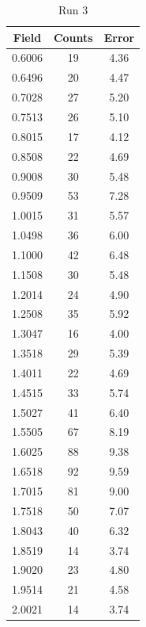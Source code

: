 \begin{table}[h!]
\caption{Run 3}
\begin{tabular}{|c|c|c|} \hline
Field	&	Counts	&	Error	\\ \hline
0.6006	&	19	&	4.36	\\ \hline
0.6496	&	20	&	4.47	\\ \hline
0.7028	&	27	&	5.20	\\ \hline
0.7513	&	26	&	5.10	\\ \hline
0.8015	&	17	&	4.12	\\ \hline
0.8508	&	22	&	4.69	\\ \hline
0.9008	&	30	&	5.48	\\ \hline
0.9509	&	53	&	7.28	\\ \hline
1.0015	&	31	&	5.57	\\ \hline
1.0498	&	36	&	6.00	\\ \hline
1.1000	&	42	&	6.48	\\ \hline
1.1508	&	30	&	5.48	\\ \hline
1.2014	&	24	&	4.90	\\ \hline
1.2508	&	35	&	5.92	\\ \hline
1.3047	&	16	&	4.00	\\ \hline
1.3518	&	29	&	5.39	\\ \hline
1.4011	&	22	&	4.69	\\ \hline
1.4515	&	33	&	5.74	\\ \hline
1.5027	&	41	&	6.40	\\ \hline
1.5505	&	67	&	8.19	\\ \hline
1.6025	&	88	&	9.38	\\ \hline
1.6518	&	92	&	9.59	\\ \hline
1.7015	&	81	&	9.00	\\ \hline
1.7518	&	50	&	7.07	\\ \hline
1.8043	&	40	&	6.32	\\ \hline
1.8519	&	14	&	3.74	\\ \hline
1.9020	&	23	&	4.80	\\ \hline
1.9514	&	21	&	4.58	\\ \hline
2.0021	&	14	&	3.74	\\ \hline
\end{tabular}
\end{table}

